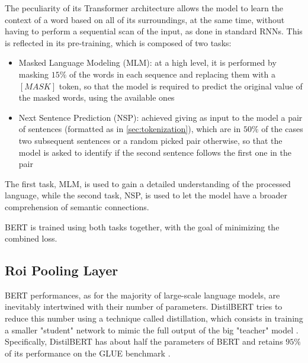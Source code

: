 \documentclass[a4paper,10pt]{report}
\begin{document}
The peculiarity of its Transformer architecture allows the model to learn the context of a word based on all of its surroundings, at the same time, without having to perform a sequential scan of the input, as done in standard RNNs. This is reflected in its pre-training, which is composed of two tasks:
\begin{itemize}
  \item Masked Language Modeling (MLM): at a high level, it is performed by masking $15\%$ of the words in each sequence and replacing them with a $[MASK]$ token, so that the model is required to predict the original value of the masked words, using the available ones
  \item Next Sentence Prediction (NSP): achieved giving as input to the model a pair of sentences (formatted as in \ref{sec:tokenization}), which are in $50\%$ of the cases two subsequent sentences or a random picked pair otherwise, so that the model is asked to identify if the second sentence follows the first one in the pair
\end{itemize}
The first task, MLM, is used to gain a detailed understanding of the processed language, while the second task, NSP, is used to let the model have a broader comprehension of semantic connections.

BERT is trained using both tasks together, with the goal of minimizing the combined loss.

\subsection{Roi Pooling Layer}\label{subsec:roi-pooling}
BERT performances, as for the majority of large-scale language models, are inevitably intertwined with their number of parameters. DistilBERT \cite{distilbert,distilbert-article} tries to reduce this number using a technique called distillation, which consists in training a smaller "student" network to mimic the full output of the big "teacher" model \cite{distillation}. Specifically, DistilBERT has about half the parameters of BERT and retains $95\%$ of its performance on the GLUE benchmark \cite{glue}.
\end{document}
